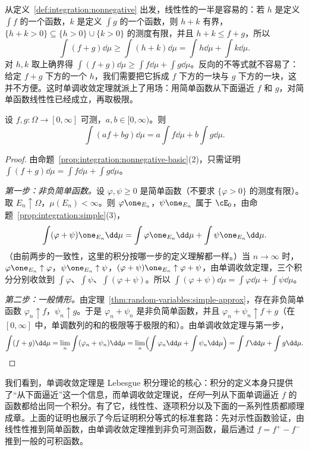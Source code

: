 
从定义~\ref{def:integration:nonnegative} 出发，线性性的一半是容易的：若 $h$ 是定义 $\int f$ 的一个函数，$k$ 是定义 $\int g$ 的一个函数，则 $h+k$ 有界，$\{h+k>0\}\subseteq\{h>0\}\cup\{k>0\}$ 的测度有限，并且 $h+k\leqslant f+g$，所以
\[
\int(f+g)\dd\mu\geqslant\int(h+k)\dd\mu=\int h\dd\mu+\int k\dd\mu .
\]
对 $h,k$ 取上确界得 $\int(f+g)\dd\mu\geqslant\int f\dd\mu+\int g\dd\mu$。反向的不等式就不容易了：给定 $f+g$ 下方的一个 $h$，我们需要把它拆成 $f$ 下方的一块与 $g$ 下方的一块，这并不方便。这时单调收敛定理就派上了用场：用简单函数从下面逼近 $f$ 和 $g$，对简单函数线性性已经成立，再取极限。

\begin{theorem}[非负函数积分的线性性]\label{thm:integration:linear-nonnegative}
设 $f,g:\Omega\to[0,\infty]$ 可测，$a,b\in[0,\infty)$。则
\[
\int(af+bg)\dd\mu=a\int f\dd\mu+b\int g\dd\mu .
\]
\end{theorem}
\begin{proof}
由命题~\ref{prop:integration:nonnegative-basic}(2)，只需证明 $\int(f+g)\dd\mu=\int f\dd\mu+\int g\dd\mu$。

\emph{第一步：非负简单函数。}设 $\varphi,\psi\geqslant0$ 是简单函数（不要求 $\{\varphi>0\}$ 的测度有限）。取 $E_n\uparrow\Omega$，$\mu(E_n)<\infty$。则 $\varphi\one_{E_n}$，$\psi\one_{E_n}$ 属于 $\cE_0$，由命题~\ref{prop:integration:simple}(3)，
\[
\int(\varphi+\psi)\one_{E_n}\dd\mu=\int\varphi\one_{E_n}\dd\mu+\int\psi\one_{E_n}\dd\mu .
\]
（由前两步的一致性，这里的积分按哪一步的定义理解都一样。）当 $n\to\infty$ 时，$\varphi\one_{E_n}\uparrow\varphi$，$\psi\one_{E_n}\uparrow\psi$，$(\varphi+\psi)\one_{E_n}\uparrow\varphi+\psi$，由单调收敛定理，三个积分分别收敛到 $\int\varphi$、$\int\psi$、$\int(\varphi+\psi)$。所以 $\int(\varphi+\psi)\dd\mu=\int\varphi\dd\mu+\int\psi\dd\mu$。

\emph{第二步：一般情形。}由定理~\ref{thm:random-variables:simple-approx}，存在非负简单函数 $\varphi_n\uparrow f$，$\psi_n\uparrow g$。于是 $\varphi_n+\psi_n$ 是非负简单函数，并且 $\varphi_n+\psi_n\uparrow f+g$（在 $[0,\infty]$ 中，单调数列的和的极限等于极限的和）。由单调收敛定理与第一步，
\[
\int(f+g)\dd\mu=\lim_n\int(\varphi_n+\psi_n)\dd\mu=\lim_n\Bigl(\int\varphi_n\dd\mu+\int\psi_n\dd\mu\Bigr)=\int f\dd\mu+\int g\dd\mu .
\]
\end{proof}

\begin{remark}
我们看到，单调收敛定理是 Lebesgue 积分理论的核心：积分的定义本身只提供了“从下面逼近”这一个信息，而单调收敛定理说，\emph{任何}一列从下面单调逼近 $f$ 的函数都给出同一个积分。有了它，线性性、逐项积分以及下面的一系列性质都顺理成章。上面的证明也展示了今后证明积分等式的标准套路：先对示性函数验证，由线性性推到简单函数，由单调收敛定理推到非负可测函数，最后通过 $f=f^+-f^-$ 推到一般的可积函数。
\end{remark}

